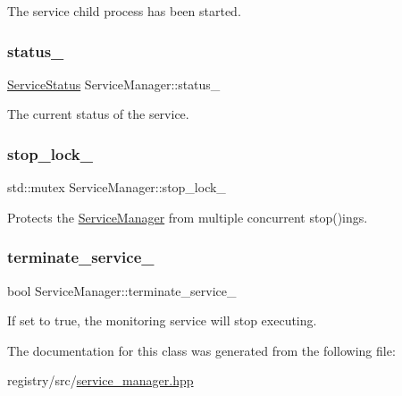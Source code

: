 The service child process has been started. \mbox{\label{classServiceManager_a42f26d759ac8c72acc67e1ac9ef442d3}} 
\subsubsection{\texorpdfstring{status\+\_\+}{status\_}}
{\footnotesize\ttfamily \hyperlink{classServiceManager_af3f2b1502eece536d0e4c8d3f2fa439d}{Service\+Status} Service\+Manager\+::status\+\_\+\hspace{0.3cm}{\ttfamily [private]}}

The current status of the service. \mbox{\label{classServiceManager_ad60510e962c31ea8b1d0867701d95582}} 
\subsubsection{\texorpdfstring{stop\+\_\+lock\+\_\+}{stop\_lock\_}}
{\footnotesize\ttfamily std\+::mutex Service\+Manager\+::stop\+\_\+lock\+\_\+\hspace{0.3cm}{\ttfamily [private]}}

Protects the \hyperlink{classServiceManager}{Service\+Manager} from multiple concurrent stop()ings. \mbox{\label{classServiceManager_a36d84d3bd84c63bed0bdf916ca76b9a8}} 
\subsubsection{\texorpdfstring{terminate\+\_\+service\+\_\+}{terminate\_service\_}}
{\footnotesize\ttfamily bool Service\+Manager\+::terminate\+\_\+service\+\_\+\hspace{0.3cm}{\ttfamily [private]}}

If set to true, the monitoring service will stop executing. 

The documentation for this class was generated from the following file\+:\begin{DoxyCompactItemize}
\item 
registry/src/\hyperlink{service__manager_8hpp}{service\+\_\+manager.\+hpp}\end{DoxyCompactItemize}
